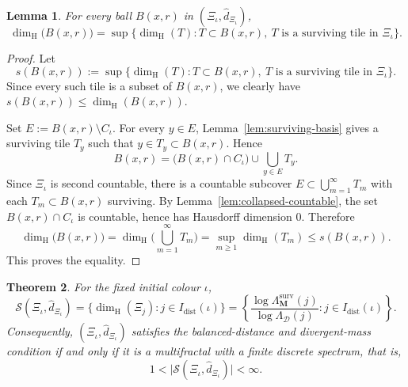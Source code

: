 \documentclass[12pt]{iopart}
\newtheorem{theorem}{Theorem}[section]
\newtheorem{lemma}[theorem]{Lemma}
\newcommand*{\dist}{d}
\newcommand*{\dimh}{\dim_\mathrm{H}}
\begin{document}
\begin{lemma}\label{lem:ball-dimension}
For every ball $B(x,r)$ in $(\Xi_\iota,\hat\dist_{\Xi_\iota})$,
\[
\dimh\big(B(x,r)\big)
=
\sup\big\{
\dimh(T):
T\subset B(x,r),\ 
T \text{ is a surviving tile in } \Xi_\iota
\big\}.
\]
\end{lemma}

\begin{proof}
Let
\[
s(B(x,r))
:=
\sup\big\{
\dimh(T):
T\subset B(x,r),\ 
T \text{ is a surviving tile in } \Xi_\iota
\big\}.
\]
Since every such tile is a subset of $B(x,r)$, we clearly have $s(B(x,r))\le \dimh(B(x,r))$.

Set $E:=B(x,r)\setminus C_\iota$.
For every $y\in E$, Lemma~\ref{lem:surviving-basis} gives a surviving tile $T_y$ such that
$y\in T_y\subset B(x,r)$.
Hence
\[
B(x,r)
=
\big(B(x,r)\cap C_\iota\big)\cup \bigcup_{y\in E}T_y.
\]
Since $\Xi_\iota$ is second countable, there is a countable subcover
$E\subset \bigcup_{m=1}^\infty T_m$ with each $T_m\subset B(x,r)$ surviving.
By Lemma~\ref{lem:collapsed-countable}, the set $B(x,r)\cap C_\iota$ is countable, hence has Hausdorff dimension $0$.
Therefore
\[
\dimh\big(B(x,r)\big)
=
\dimh\Big(\bigcup_{m=1}^\infty T_m\Big)
=
\sup_{m\ge 1}\dimh(T_m)
\le
s(B(x,r)).
\]
This proves the equality.
\end{proof}

\begin{theorem}\label{thm:multifractal}
For the fixed initial colour $\iota$,
\[
\mathscr S(\Xi_\iota,\hat\dist_{\Xi_\iota})
=
\big\{
\dimh(\Xi_j):
j\in I_{\mathrm{dist}}(\iota)
\big\}
=
\left\{
\frac{
\log \Lambda_{\mathbf M}^{\mathrm{surv}}(j)
}{
\log \Lambda_{\mathcal D}(j)
}
:
j\in I_{\mathrm{dist}}(\iota)
\right\}.
\]
Consequently, $(\Xi_\iota,\hat\dist_{\Xi_\iota})$ satisfies the balanced-distance and divergent-mass condition if and only if it is a multifractal with a finite discrete spectrum, that is,
\[
1<
\big|
\mathscr S(\Xi_\iota,\hat\dist_{\Xi_\iota})
\big|
<\infty.
\]
\end{theorem}
\end{document}

